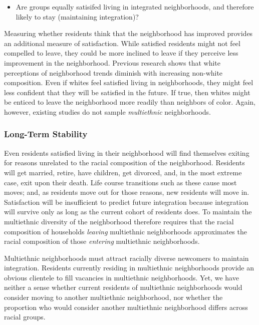 \documentclass{baderart}
\providecommand{\tightlist}{%
  \setlength{\itemsep}{0pt}\setlength{\parskip}{0pt}}
\begin{document}
\begin{itemize} \tightlist \item   Are groups equally satisifed living in integrated neighborhoods, and   therefore likely to stay (maintaining integration)? \end{itemize}

Measuring whether residents think that the neighborhood has improved provides an additional measure of satisfaction. While satisfied residents might not feel compelled to leave, they could be more inclined to leave if they perceive less improvement in the neighborhood. Previous research shows that white perceptions of neighborhood trends diminish with increasing non-white composition. Even if whites feel satisfied living in neighborhoods, they might feel less confident that they will be satisfied in the future. If true, then whites might be enticed to leave the neighborhood more readily than neighbors of color. Again, however, existing studies do not sample \emph{multiethnic} neighborhoods.


\subsubsection{Long-Term Stability}\label{long-term-stability}

Even residents satisfied living in their neighborhood will find themselves exiting for reasons unrelated to the racial composition of the neighborhood. Residents will get married, retire, have children, get divorced, and, in the most extreme case, exit upon their death. Life course transitions such as these cause most moves; and, as residents move out for those reasons, new residents will move in. Satisfaction will be insufficient to predict future integration because integration will survive only as long as the current cohort of residents does. To maintain the multiethnic diversity of the neighborhood therefore requires that the racial composition of households \emph{leaving} multiethnic neighborhoods approximates the racial composition of those \emph{entering} multiethnic neighborhoods.

Multiethnic neighborhoods must attract racially diverse newcomers to maintain integration. Residents currently residing in multiethnic neighborhoods provide an obvious clientele to fill vacancies in multiethnic neighborhoods. Yet, we have neither a sense whether current residents of multiethnic neighborhoods would consider moving to another multiethnic neighborhood, nor whether the proportion who would consider another multiethnic neighborhood differs across racial groups.
\end{document}
